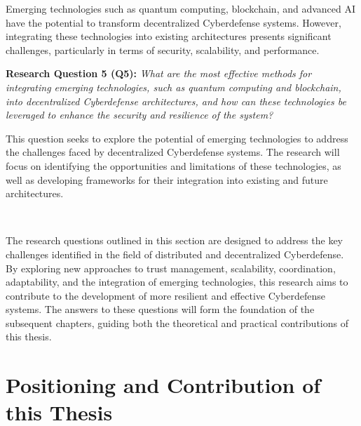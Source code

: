 Emerging technologies such as quantum computing, blockchain, and advanced AI have the potential to transform decentralized Cyberdefense systems. However, integrating these technologies into existing architectures presents significant challenges, particularly in terms of security, scalability, and performance.

\textbf{Research Question 5 (Q5):} \textit{What are the most effective methods for integrating emerging technologies, such as quantum computing and blockchain, into decentralized Cyberdefense architectures, and how can these technologies be leveraged to enhance the security and resilience of the system?}

This question seeks to explore the potential of emerging technologies to address the challenges faced by decentralized Cyberdefense systems. The research will focus on identifying the opportunities and limitations of these technologies, as well as developing frameworks for their integration into existing and future architectures.

\

The research questions outlined in this section are designed to address the key challenges identified in the field of distributed and decentralized Cyberdefense. By exploring new approaches to trust management, scalability, coordination, adaptability, and the integration of emerging technologies, this research aims to contribute to the development of more resilient and effective Cyberdefense systems. The answers to these questions will form the foundation of the subsequent chapters, guiding both the theoretical and practical contributions of this thesis.

\section{Positioning and Contribution of this Thesis}



